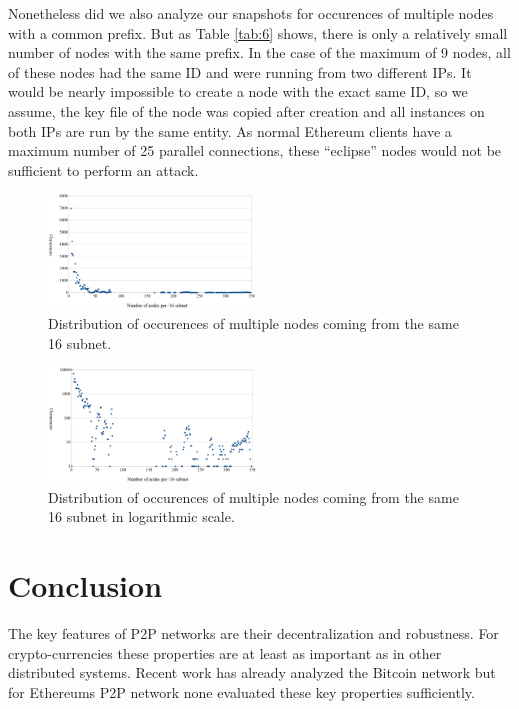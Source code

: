 \documentclass[10pt,conference,final]{IEEEtran}
\begin{document}
Nonetheless did we also analyze our snapshots for occurences of multiple nodes with a common prefix.
But as Table \ref{tab:6} shows, there is only a relatively small number of nodes with the same prefix.
In the case of the maximum of 9 nodes, all of these nodes had the same ID and were running from two different IPs.
It would be nearly impossible to create a node with the exact same ID, so we assume, the key file of the node was copied after creation and all instances on both IPs are run by the same entity.
As normal Ethereum clients have a maximum number of 25 parallel connections, these ``eclipse'' nodes would not be sufficient to perform an attack.


\begin{figure}[!t]
\label{fig:7}
\centering
\includegraphics[width=0.49\textwidth]{./Pictures/sybils1.png}
\caption{Distribution of occurences of multiple nodes coming from the same \/16 subnet.}
\end{figure}

\begin{figure}[!t]
\label{fig:8}
\centering
\includegraphics[width=0.49\textwidth]{./Pictures/sybils2.png}
\caption{Distribution of occurences of multiple nodes coming from the same \/16 subnet in logarithmic scale.}
\end{figure}

\vspace{2mm}

\section{Conclusion}
\label{sec:Conclusion}
The key features of P2P networks are their decentralization and robustness.
For crypto-currencies these properties are at least as important as in other distributed systems.
Recent work has already analyzed the Bitcoin network but for Ethereums P2P network none evaluated these key properties sufficiently.
\end{document}
